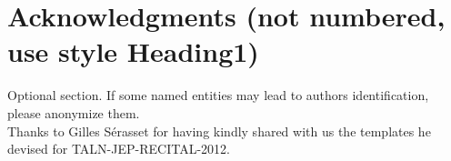 \documentclass[10pt,a5paper,twoside]{article}
\begin{document}
\section*{Acknowledgments (not numbered, use style Heading1)}
Optional section. If some named entities may lead to authors identification, please anonymize them.	\\
Thanks to Gilles S\'erasset for having kindly shared with us the templates he devised for TALN-JEP-RECITAL-2012. 

%





\end{document}
